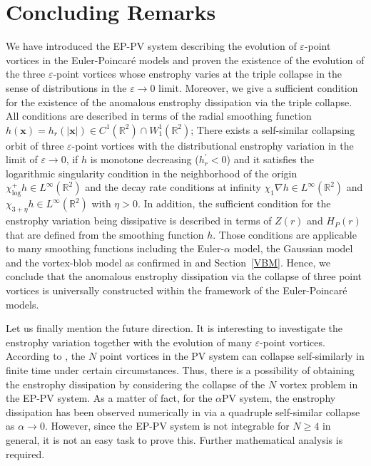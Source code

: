 \documentclass{article}
\theoremstyle{definition}
\begin{document}
\section{Concluding Remarks}
\label{concluding}



We have introduced the EP-PV system describing the evolution of $\varepsilon$-point vortices in the Euler-Poincar\'{e} models and proven the existence of the evolution of the three $\varepsilon$-point vortices whose enstrophy varies at the triple collapse in the sense of distributions in the $\varepsilon \rightarrow 0$ limit. Moreover, we give a sufficient condition for the existence of the anomalous enstrophy dissipation via the triple collapse. All conditions are described in terms of the radial smoothing function $h({\bm x})=h_r(\vert{\bm x}\vert) \in C^1(\mathbb{R}^2) \cap W_1^1(\mathbb{R}^2)$; There exists a self-similar collapsing orbit of three $\varepsilon$-point vortices with the distributional enstrophy variation in the limit of $\varepsilon \rightarrow 0$, if $h$ is monotone decreasing ($h_r^\prime <0$) and it satisfies the logarithmic singularity condition in the neighborhood of the origin $\chi_{\log}^{+} h \in L^\infty(\mathbb{R}^2)$ and the decay rate conditions at infinity $\chi_1 \nabla h \in L^\infty(\mathbb{R}^2)$ and $\chi_{3+\eta} h \in L^\infty(\mathbb{R}^2)$ with $\eta >0$. In addition, the sufficient condition for the enstrophy variation being dissipative is described in terms of  $Z(r)$ and $H_P(r)$ that are defined from the smoothing function $h$. Those conditions are  applicable to many smoothing functions including the Euler-$\alpha$ model, the Gaussian model and the vortex-blob model as confirmed in \cite{G.2} and Section~\ref{VBM}. Hence, we conclude that the anomalous enstrophy dissipation via the collapse of three point vortices is universally constructed within the framework of the Euler-Poincar\'{e} models.

Let us finally mention the future direction. It is interesting to investigate the enstrophy variation together with the evolution of many $\varepsilon$-point vortices. According to \cite{Kimura}, the $N$ point vortices in the PV system can collapse self-similarly in finite time under certain circumstances. Thus, there is a possibility of obtaining the enstrophy dissipation by considering the collapse of the $N$ vortex problem in the EP-PV system. As a matter of fact, for the $\alpha$PV system, the enstrophy dissipation has been  observed numerically in \cite{G.1} via a quadruple self-similar collapse as $\alpha \rightarrow 0$. However, since the EP-PV system is not integrable for $N \geq 4$ in general, it is not an easy task to prove this. Further mathematical analysis is required.
\end{document}
